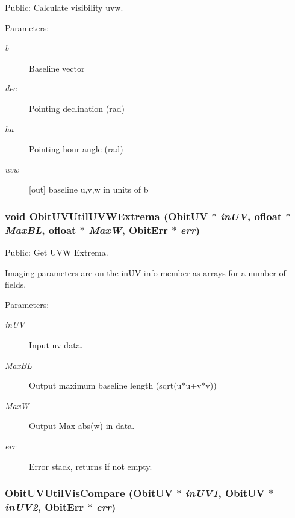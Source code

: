 Public: Calculate visibility uvw. 

\begin{Desc}
\item[Parameters:]
\begin{description}
\item[{\em b}]Baseline vector \item[{\em dec}]Pointing declination (rad) \item[{\em ha}]Pointing hour angle (rad) \item[{\em uvw}][out] baseline u,v,w in units of b \end{description}
\end{Desc}
\subsubsection{\setlength{\rightskip}{0pt plus 5cm}void Obit\-UVUtil\-UVWExtrema ({\bf Obit\-UV} $\ast$ {\em in\-UV}, {\bf ofloat} $\ast$ {\em Max\-BL}, {\bf ofloat} $\ast$ {\em Max\-W}, {\bf Obit\-Err} $\ast$ {\em err})}\label{ObitUVUtil_8c_a4}


Public: Get UVW Extrema. 

Imaging parameters are on the in\-UV info member as arrays for a number of fields. \begin{Desc}
\item[Parameters:]
\begin{description}
\item[{\em in\-UV}]Input uv data. \item[{\em Max\-BL}]Output maximum baseline length (sqrt(u$\ast$u+v$\ast$v)) \item[{\em Max\-W}]Output Max abs(w) in data. \item[{\em err}]Error stack, returns if not empty. \end{description}
\end{Desc}
\subsubsection{ Obit\-UVUtil\-Vis\-Compare ({\bf Obit\-UV} $\ast$ {\em in\-UV1}, {\bf Obit\-UV} $\ast$ {\em in\-UV2}, {\bf Obit\-Err} $\ast$ {\em err})}\label{ObitUVUtil_8c_a8}


